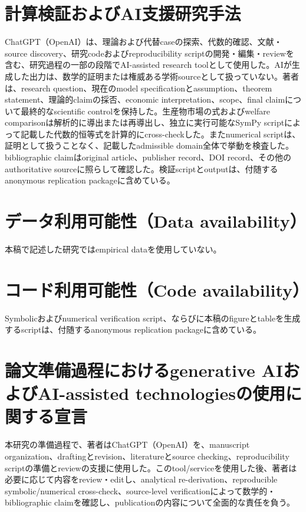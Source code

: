 \section*{計算検証およびAI支援研究手法}
ChatGPT（OpenAI）は、理論および代替caseの探索、代数的確認、文献・source discovery、研究codeおよびreproducibility scriptの開発・編集・reviewを含む、研究過程の一部の段階でAI-assisted research toolとして使用した。AIが生成した出力は、数学的証明または権威ある学術sourceとして扱っていない。著者は、research question、現在のmodel specificationとassumption、theorem statement、理論的claimの採否、economic interpretation、scope、final claimについて最終的なscientific controlを保持した。生産物市場の式およびwelfare comparisonは解析的に導出または再導出し、独立に実行可能なSymPy scriptによって記載した代数的恒等式を計算的にcross-checkした。またnumerical scriptは、証明として扱うことなく、記載したadmissible domain全体で挙動を検査した。bibliographic claimはoriginal article、publisher record、DOI record、その他のauthoritative sourceに照らして確認した。検証scriptとoutputは、付随するanonymous replication packageに含めている。

\section*{データ利用可能性（Data availability）}
本稿で記述した研究ではempirical dataを使用していない。

\section*{コード利用可能性（Code availability）}
Symbolicおよびnumerical verification script、ならびに本稿のfigureとtableを生成するscriptは、付随するanonymous replication packageに含めている。

\section*{論文準備過程におけるgenerative AIおよびAI-assisted technologiesの使用に関する宣言}
本研究の準備過程で、著者はChatGPT（OpenAI）を、manuscript organization、draftingとrevision、literatureとsource checking、reproducibility scriptの準備とreviewの支援に使用した。このtool/serviceを使用した後、著者は必要に応じて内容をreview・editし、analytical re-derivation、reproducible symbolic/numerical cross-check、source-level verificationによって数学的・bibliographic claimを確認し、publicationの内容について全面的な責任を負う。
